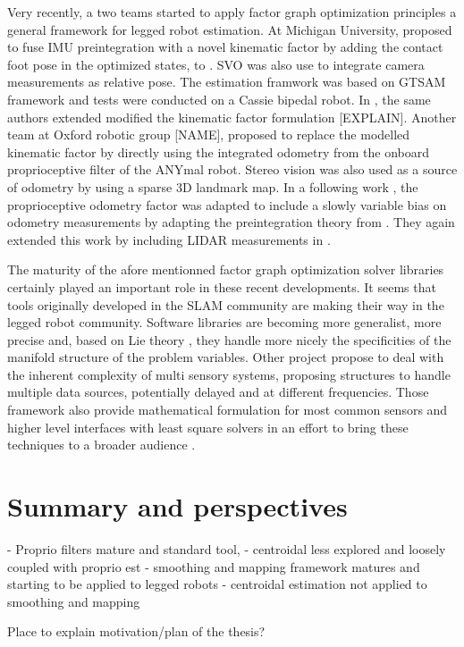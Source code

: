 Very recently, a two teams started to apply factor graph optimization principles a general framework for legged robot estimation. At Michigan University, \cite{hartley2018legged} 
proposed to fuse IMU preintegration with a novel kinematic factor by adding the contact foot pose in the optimized states, to \cite{bloesch2013state,rotella2014state}. 
SVO \cite{forster2014svo} was also use to integrate camera measurements as relative pose. The estimation framwork was based on GTSAM framework \cite{dellaert2012factor}
and tests were conducted on a Cassie bipedal robot. In \cite{hartley2018hybrid}, the same authors extended 
modified the kinematic factor formulation [EXPLAIN]. Another team at Oxford robotic group [NAME], \cite{wisth2019robust} proposed to replace the modelled 
kinematic factor by directly using the integrated odometry from the onboard proprioceptive filter of the ANYmal robot. Stereo vision was also used as a source of
odometry by using a sparse 3D landmark map. In a following work \cite{wisth2020preintegrated}, the proprioceptive odometry factor was adapted
to include a slowly variable bias on odometry measurements by adapting the preintegration theory from \cite{forster2017-TRO}. They again extended this work
by including LIDAR measurements in \cite{wisth2021vilens}.

The maturity of the afore mentionned factor graph optimization solver libraries certainly played an important role in these recent developments. It seems
that tools originally developed in the SLAM community are making their way in the legged robot community. Software libraries are becoming more
generalist, more precise and, based on Lie theory \cite{sola2018micro}, they handle more nicely the specificities of the manifold structure of the problem variables.
Other project propose to deal with the inherent complexity of multi sensory systems, proposing structures to handle multiple data sources, potentially delayed and at
different frequencies. Those framework also provide mathematical formulation for most common sensors and higher level interfaces with least square solvers 
in an effort to bring these techniques to a broader audience \cite{sola2021wolf, blanco2019modular, colosi2020plug}.



\section{Summary and perspectives}
- Proprio filters mature and standard tool, 
- centroidal less explored and loosely coupled with proprio est
- smoothing and mapping framework matures and starting to be applied to legged robots
- centroidal estimation not applied to smoothing and mapping

Place to explain motivation/plan of the thesis?
